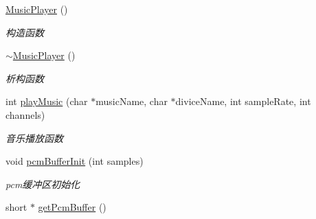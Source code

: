 \begin{DoxyCompactItemize}
\item 
\hypertarget{classMusicPlayer_a157211d92ff78fe87fdef2bb77a2b5fa}{\hyperlink{classMusicPlayer_a157211d92ff78fe87fdef2bb77a2b5fa}{\-Music\-Player} ()}\label{classMusicPlayer_a157211d92ff78fe87fdef2bb77a2b5fa}

\begin{DoxyCompactList}\small\item\em 构造函数 \end{DoxyCompactList}\item 
\hypertarget{classMusicPlayer_a3bc16c3be2206fabd90ce8ad3551d736}{\hyperlink{classMusicPlayer_a3bc16c3be2206fabd90ce8ad3551d736}{$\sim$\-Music\-Player} ()}\label{classMusicPlayer_a3bc16c3be2206fabd90ce8ad3551d736}

\begin{DoxyCompactList}\small\item\em 析构函数 \end{DoxyCompactList}\item 
int \hyperlink{classMusicPlayer_a1428fc3f16799945f3eb282ffcdd25d6}{play\-Music} (char $\ast$music\-Name, char $\ast$divice\-Name, int sample\-Rate, int channels)
\begin{DoxyCompactList}\small\item\em 音乐播放函数 \end{DoxyCompactList}\item 
\hypertarget{classMusicPlayer_a1191002582638b11aa802a24efb0aaa6}{void \hyperlink{classMusicPlayer_a1191002582638b11aa802a24efb0aaa6}{pcm\-Buffer\-Init} (int samples)}\label{classMusicPlayer_a1191002582638b11aa802a24efb0aaa6}

\begin{DoxyCompactList}\small\item\em pcm缓冲区初始化 \end{DoxyCompactList}\item 
\hypertarget{classMusicPlayer_a3951627666f0d8951967f56657b2e0a9}{short $\ast$ \hyperlink{classMusicPlayer_a3951627666f0d8951967f56657b2e0a9}{get\-Pcm\-Buffer} ()}\label{classMusicPlayer_a3951627666f0d8951967f56657b2e0a9}


\end{DoxyCompactItemize}
